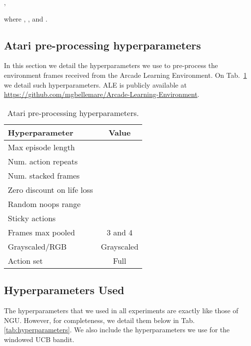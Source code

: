\documentclass{article}
\begin{document}
, 

where ,  ,  and .




\subsection{Atari pre-processing hyperparameters}
\label{atari_hypers}
In this section we detail the hyperparameters we use to pre-process the environment frames received from the Arcade Learning Environment. On Tab.~\ref{table_hyper_atari} we detail such hyperparameters. ALE is publicly available at \url{https://github.com/mgbellemare/Arcade-Learning-Environment}.

\begin{table}[h]
\centering
\begin{tabular}{l|c}
\textbf{Hyperparameter} & \textbf{Value} \\ \hline
Max episode length &   \\ \hline 
Num. action repeats &  \\ \hline
Num. stacked frames &  \\ \hline
Zero discount on life loss &  \\ \hline
Random noops range &  \\ \hline
Sticky actions &  \\ \hline
Frames max pooled & 3 and 4\\ \hline
Grayscaled/RGB & Grayscaled \\ \hline
Action set & Full \\ \hline
\end{tabular}
\caption{Atari pre-processing hyperparameters.}
\label{table_hyper_atari}
\vspace{-2ex}
\end{table}

\clearpage
\subsection{Hyperparameters Used}
\label{app:hyperparameters}

The hyperparameters that we used in all experiments are exactly like those of NGU. However, for completeness, we detail them below in Tab. \ref{tab:hyperparameters}. We also include the hyperparameters we use for the windowed UCB bandit.
\end{document}
